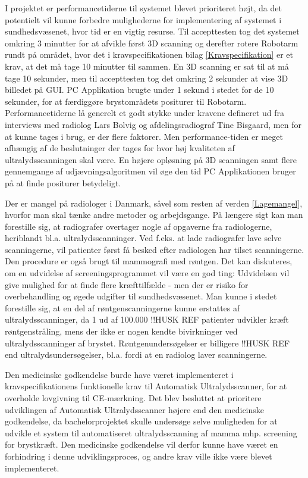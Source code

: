 I projektet er performancetiderne til systemet blevet prioriteret højt, da det potentielt vil kunne forbedre mulighederne for implementering af systemet i sundhedsvæsenet, hvor tid er en vigtig resurse. Til accepttesten tog det systemet omkring 3 minutter for at afvikle først 3D scanning og derefter rotere Robotarm rundt på området, hvor det i kravspecifikationen bilag \ref{Kravspecifikation} er et krav, at det må tage 10 minutter til sammen. En 3D scanning er sat til at må tage 10 sekunder, men til accepttesten tog det omkring 2 sekunder at vise 3D billedet på GUI. PC Applikation brugte under 1 sekund i stedet for de 10 sekunder, for at færdiggøre brystområdets positurer til Robotarm. Performancetiderne lå generelt et godt stykke under kravene defineret ud fra interviews med radiolog Lars Bolvig og afdelingsradiograf Tine Bisgaard, men for at kunne tages i brug, er der flere faktorer. Men performance-tiden er meget afhængig af de beslutninger der tages for hvor høj kvaliteten af ultralydsscanningen skal være. En højere opløsning på 3D scanningen samt flere gennemgange af udjævningsalgoritmen vil øge den tid PC Applikationen bruger på at finde positurer betydeligt.  

Der er mangel på radiologer i Danmark, såvel som resten af verden \ref{Lagemangel}, hvorfor man skal tænke andre metoder og arbejdsgange. På længere sigt kan man forestille sig, at radiografer overtager nogle af opgaverne fra radiologerne, heriblandt bl.a. ultralydsscanninger. Ved f.eks. at lade radiografer lave selve scanningerne, vil patienter først få besked efter radiologen har tilset scanningerne. Den procedure er også brugt til mammografi med røntgen. Det kan diskuteres, om en udvidelse af screeningsprogrammet vil være en god ting: Udvidelsen vil give mulighed for at finde flere kræfttilfælde - men der er risiko for overbehandling og øgede udgifter til sundhedsvæsenet. Man kunne i stedet forestille sig, at en del af røntgenscanningerne kunne erstattes af ultralydsscanninger, da 1 ud af 100.000 !!HUSK REF patienter udvikler kræft røntgenstråling, mens der ikke er nogen kendte bivirkninger ved ultralydsscanninger af brystet. Røntgenundersøgelser er billigere !!HUSK REF end ultralydsundersøgelser, bl.a. fordi at en radiolog laver scanningerne. 

Den medicinske godkendelse burde have været implementeret i kravspecifikationens funktionelle krav til Automatisk Ultralydsscanner, for at overholde lovgivning til CE-mærkning. Det blev besluttet at prioritere udviklingen af Automatisk Ultralydsscanner højere end den medicinske godkendelse, da bachelorprojektet skulle undersøge selve muligheden for at udvikle et system til automatiseret ultralydsscanning af mamma mhp. screening for brystkræft. Den medicinske godkendelse vil derfor kunne have været en forhindring i denne udviklingsproces, og andre krav ville ikke være blevet implementeret. 

